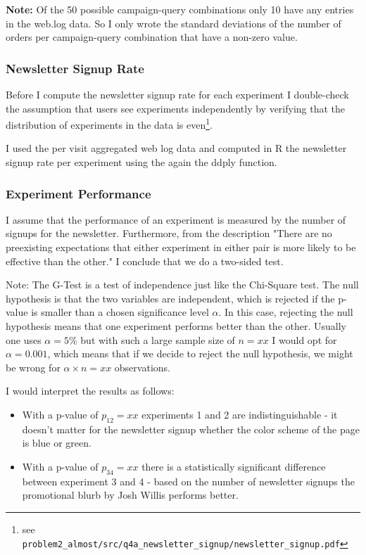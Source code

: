 \documentclass{article}\usepackage[]{graphicx}\usepackage[]{color}
\begin{document}
\textbf{Note:} Of the 50 possible campaign-query combinations only 10 have any entries in the web.log data. So I only wrote the standard deviations of the number of orders per campaign-query combination that have a non-zero value. 


\subsubsection{Newsletter Signup Rate} %
\label{subsub:signup}

Before I compute the newsletter signup rate for each experiment I double-check the assumption that users see experiments independently by verifying that the distribution of experiments in the data is even\footnote{see \verb+problem2_almost/src/q4a_newsletter_signup/newsletter_signup.pdf+}.

I used the per visit aggregated web log data and computed in R the newsletter signup rate per experiment using the again the ddply function.


\subsubsection{Experiment Performance} %
\label{subsub:performance}

I assume that the performance of an experiment is measured by the number of signups for the newsletter. Furthermore, from the description "There are no preexisting expectations that either experiment in either pair is more likely to be effective than the other." I conclude that we do a two-sided test.

Note: The G-Test is a test of independence just like the Chi-Square test. The null hypothesis is that the two variables are independent, which is rejected if the p-value is smaller than a chosen significance level $\alpha$. In this case, rejecting the null hypothesis means that one experiment performs better than the other.
Usually one uses $\alpha=5\%$ but with such a large sample size of $n=xx$ I would opt for $\alpha=0.001$, which means that if we decide to reject the null hypothesis, we might be wrong for $\alpha \times n=xx$ observations.

I would interpret the results as follows: 
\begin{itemize}
	\item With a p-value of $p_{12}=xx$ experiments 1 and 2 are indistinguishable - it doesn't matter for the newsletter signup whether the color scheme of the page is blue or green.
	\item With a p-value of $p_{34}=xx$ there is a statistically significant difference between experiment 3 and 4 - based on the number of newsletter signups the promotional blurb by Josh Willis performs better.	 
\end{itemize}
\end{document}
